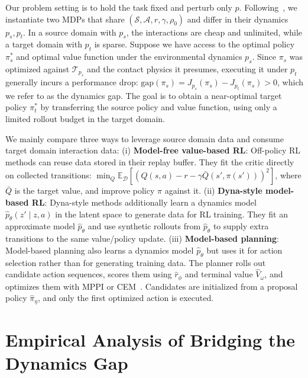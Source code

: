 \documentclass{article} %
\begin{document}
Our problem setting is to hold the task fixed and perturb only $p$. Following~\citet{kearns2002near, lobel2024optimal}, we instantiate two MDPs that share $(\mathcal{S}, \mathcal{A}, r, \gamma, \rho_0)$ and differ in their dynamics $p_s, p_t$. In a source domain with $p_s$, the interactions are cheap and unlimited, while a target domain with $p_t$ is sparse. Suppose we have access to the optimal policy $\pi_s^*$ and optimal value function under the environmental dynamics $p_s$. Since $\pi_s$ was optimized against $\mathcal{T}_{p_s}$ and the contact physics it presumes, executing it under $p_t$ generally incurs a performance drop: $\mathrm{gap}(\pi_s) = J_{p_s}(\pi_s) - J_{p_t}(\pi_s) > 0$, which we refer to as the dynamics gap. The goal is to obtain a near-optimal target policy $\pi^*_t$ by transferring the source policy and value function, using only a limited rollout budget in the target domain.

We mainly compare three ways to leverage source domain data and consume target domain interaction data: (i) \textbf{Model-free value-based RL}: Off-policy RL methods can reuse data stored in their replay buffer. They fit the critic directly on collected transitions: $\min_{Q} \mathbb{E}_{\mathcal{D}} [ (Q(s,a) - r - \gamma \bar{Q}(s', \pi(s')))^2]$, where $\bar{Q}$ is the target value, and improve policy $\pi$ against it. (ii) \textbf{Dyna-style model-based RL}: Dyna-style methods additionally learn a dynamics model $\hat{p}_\theta(z' \mid z,a)$ in the latent space to generate data for RL training. They fit an approximate model $\hat{p}_\theta$ and use synthetic rollouts from $\hat{p}_\theta$ to supply extra transitions to the same value/policy update. (iii) \textbf{Model-based planning}: Model-based planning also learns a dynamics model $\hat{p}_\theta$ but uses it for action selection rather than for generating training data. The planner rolls out candidate action sequences, scores them using $\hat{r}_\phi$ and terminal value $\hat{V}_\omega$, and optimizes them with MPPI or CEM~\citep{williams2015model}. Candidates are initialized from a proposal policy $\hat{\pi}_\eta$, and only the first optimized action is executed.


\section{Empirical Analysis of Bridging the Dynamics Gap}
\label{empirical}
\end{document}
